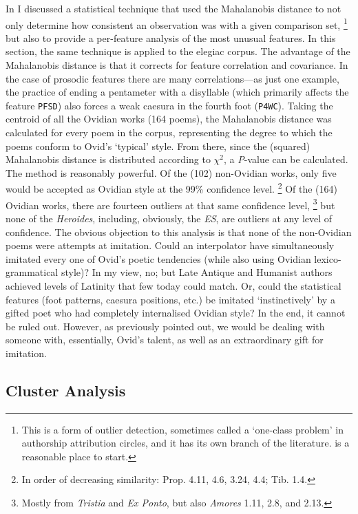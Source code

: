 \documentclass[twocolumn, switch, a4paper]{article} %
\begin{document}
In  I discussed a statistical technique that
used the Mahalanobis distance to not only determine how consistent an
observation was with a given comparison set,%
%
    \footnote{This is a form of outlier detection, sometimes called a
    `one-class problem' in authorship attribution circles, and it has its own
    branch of the literature.  is a reasonable
    place to start.}
%
but also to provide a per-feature analysis of the most unusual features. In
this section, the same technique is applied to the elegiac corpus. The
advantage of the Mahalanobis distance is that it corrects for feature
correlation and covariance. In the case of prosodic features there are many
correlations---as just one example, the practice of ending a pentameter with a
disyllable (which primarily affects the feature \texttt{PFSD}) also forces a
weak caesura in the fourth foot (\texttt{P4WC}). Taking the centroid of all
the Ovidian works (164 poems), the Mahalanobis distance was calculated for
every poem in the corpus, representing the degree to which the poems conform
to Ovid's `typical' style. From there, since the (squared) Mahalanobis
distance is distributed according to $\chi^2$, a \emph{P}-value can be
calculated. The method is reasonably powerful. Of the (102) non-Ovidian works,
only five would be accepted as Ovidian style at the 99\% confidence level.%
%
    \footnote{In order of decreasing similarity: Prop. 4.11, 4.6, 3.24, 4.4;
    Tib. 1.4.}
%
Of the (164) Ovidian works, there are fourteen outliers at that same
confidence level,%
%
    \footnote{Mostly from \emph{Tristia} and \emph{Ex Ponto}, but also
    \emph{Amores} 1.11, 2.8, and 2.13.}
%
but none of the \emph{Heroides}, including, obviously, the \emph{ES}, are
outliers at any level of confidence. The obvious objection to this analysis is
that none of the non-Ovidian poems were attempts at imitation. Could an
interpolator have simultaneously imitated every one of Ovid's poetic
tendencies (while also using Ovidian lexico-grammatical style)? In my view,
no; but Late Antique and Humanist authors achieved levels of Latinity that few
today could match. Or, could the statistical features (foot patterns, caesura
positions, etc.) be imitated `instinctively' by a gifted poet who had
completely internalised Ovidian style? In the end, it cannot be ruled out.
However, as previously pointed out, we would be dealing with someone with,
essentially, Ovid's talent, as well as an extraordinary gift for imitation.

\subsection{Cluster Analysis}
\end{document}
